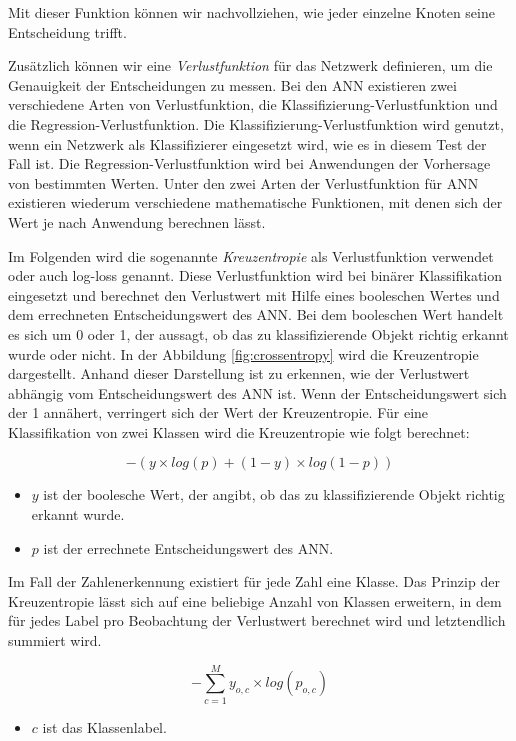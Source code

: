 Mit dieser Funktion können wir nachvollziehen, wie jeder einzelne Knoten seine Entscheidung trifft.\cite*{Braspenning1995}

Zusätzlich können wir eine \textit{Verlustfunktion} für das Netzwerk definieren, um die Genauigkeit der Entscheidungen zu messen. Bei den ANN existieren zwei verschiedene Arten von Verlustfunktion, die Klassifizierung-Verlustfunktion und die Regression-Verlustfunktion. 
Die Klassifizierung-Verlustfunktion wird genutzt, wenn ein Netzwerk als Klassifizierer eingesetzt wird, wie es in diesem Test der Fall ist. Die Regression-Verlustfunktion wird bei Anwendungen der Vorhersage von bestimmten Werten.
Unter den zwei Arten der Verlustfunktion für ANN existieren wiederum verschiedene mathematische Funktionen, mit denen sich der Wert je nach Anwendung berechnen lässt.\cite{dwivedi_2020}

Im Folgenden wird die sogenannte \textit{Kreuzentropie} als Verlustfunktion verwendet oder auch log-loss genannt. Diese Verlustfunktion wird bei binärer Klassifikation eingesetzt und berechnet den Verlustwert mit Hilfe eines booleschen Wertes und dem errechneten Entscheidungswert des ANN. Bei dem booleschen Wert handelt es sich um 0 oder 1, der aussagt, ob das zu klassifizierende Objekt richtig erkannt wurde oder nicht. In der Abbildung \ref*{fig:crossentropy} wird die Kreuzentropie dargestellt. Anhand dieser Darstellung ist zu erkennen, wie der Verlustwert abhängig vom Entscheidungswert des ANN ist. Wenn der Entscheidungswert sich der 1 annähert, verringert sich der Wert der Kreuzentropie.
Für eine Klassifikation von zwei Klassen wird die Kreuzentropie wie folgt berechnet: 

\[-(y\times log(p) + (1 - y) \times log(1-p))\]

\begin{itemize}
	\item $y$ ist der boolesche Wert, der angibt, ob das zu klassifizierende Objekt richtig erkannt wurde.
	\item $p$ ist der errechnete Entscheidungswert des ANN.
\end{itemize}

Im Fall der Zahlenerkennung existiert für jede Zahl eine Klasse. Das Prinzip der Kreuzentropie lässt sich auf eine beliebige Anzahl von Klassen erweitern, in dem für jedes Label pro Beobachtung der Verlustwert berechnet wird und letztendlich summiert wird.

\[ -\sum_{c=1}^{M}y_{o,c} \times log(p_{o,c}) \]

\begin{itemize}
	\item $c$ ist das Klassenlabel.
\end{itemize}
\cite{10.2307/2348828}

